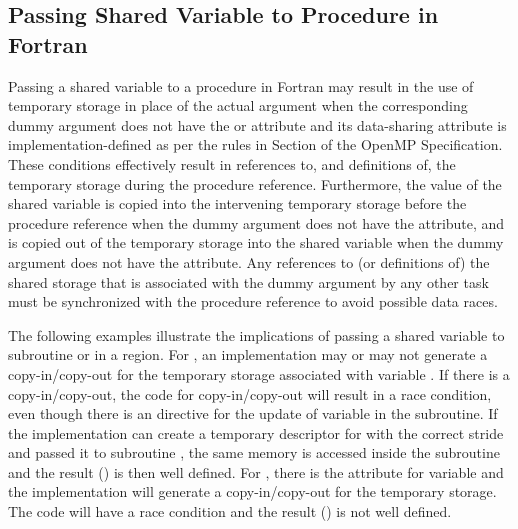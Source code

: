 \pagebreak
\begin{fortranspecific}[4ex]
\section{Passing Shared Variable to Procedure in Fortran}
\label{sec:fort_shared_var}

Passing a shared variable to a procedure in Fortran may result in the use of
temporary storage in place of the actual argument when the corresponding dummy 
argument does not have the  or  attribute and 
its data-sharing attribute is implementation-defined as per the rules in 
Section  of
the OpenMP Specification. 
These conditions effectively result in references to, and definitions of, the 
temporary storage during the procedure reference. Furthermore, the value of the 
shared variable is copied into the intervening temporary storage before the 
procedure reference when the dummy argument does not have the 
 attribute, and is copied out of the temporary storage into 
the shared variable when the dummy argument does not have the 
 attribute. Any references to (or definitions of) the shared 
storage that is associated with the dummy argument by any other task must be 
synchronized with the procedure reference to avoid possible data races.

The following examples illustrate the implications of passing a shared 
variable  to subroutine  or  in
a  region.
For , an implementation may or may not generate a copy-in/copy-out 
for the temporary storage associated with variable . 
If there is a copy-in/copy-out, the code for copy-in/copy-out will result in 
a race condition, even though there is an 
directive for the update of variable  in the subroutine. 
If the implementation can create a temporary descriptor for  
with the correct stride and passed it to subroutine , 
the same memory is accessed inside the subroutine and the result 
() is then well defined.
For , there is the  attribute for 
variable  and the implementation will generate a copy-in/copy-out 
for the temporary storage.
The code will have a race condition and the result () is
not well defined.

\end{fortranspecific}

